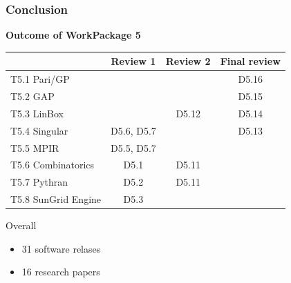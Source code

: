 \documentclass{beamer}
\begin{document}

    


\begin{frame}
  \frametitle{Conclusion}

  \textbf{Outcome of WorkPackage 5}
  \begin{center}
{\small
    \begin{tabular}{lccc}
    \toprule
        & Review 1 & Review 2 & Final review\\
    \midrule
    T5.1 Pari/GP & & & {\color{darkgreen} D5.16} \\
    T5.2 GAP     & & & {\color{darkgreen} D5.15} \\
    T5.3 LinBox  & & {D5.12} & {\color{darkgreen} D5.14} \\
    T5.4 Singular& D5.6, D5.7 & & {\color{darkgreen} D5.13} \\
    T5.5 MPIR    & D5.5, D5.7& & \\
    T5.6 Combinatorics  & D5.1& {D5.11} & \\
    T5.7 Pythran        & D5.2 & {D5.11} & \\
    T5.8 SunGrid Engine & D5.3 & & \\
    \bottomrule
    
  \end{tabular}
}
  \end{center}
  
  Overall
  \begin{itemize}
  \item 31 software relases
  \item 16 research papers
  \end{itemize}
\end{frame}
  
\end{document}
